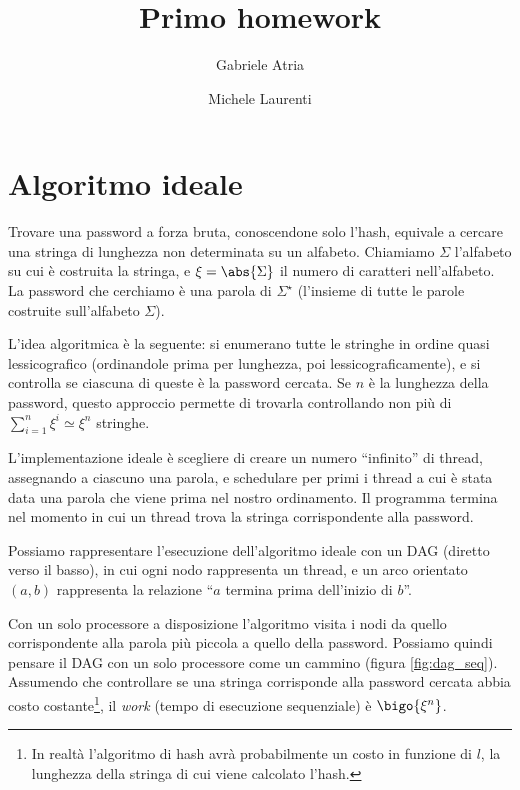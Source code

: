 \documentclass[]{myarticle}
\author{Gabriele Atria \and Michele Laurenti}
\begin{document}
\title{Primo homework}
\maketitle

\section{Algoritmo ideale}

Trovare una password a forza bruta, conoscendone solo l'hash, equivale a cercare una stringa di lunghezza non determinata su un alfabeto.
Chiamiamo $\Sigma$ l'alfabeto su cui \`e costruita la stringa, e $\xi = \abs{\Sigma}$ il numero di caratteri nell'alfabeto.
La password che cerchiamo \`e una parola di $\Sigma^{\star}$ (l'insieme di tutte le parole costruite sull'alfabeto $\Sigma$).

L'idea algoritmica \`e la seguente: si enumerano tutte le stringhe in ordine quasi lessicografico (ordinandole prima per lunghezza, poi lessicograficamente), e si controlla se ciascuna di queste \`e la password cercata.
Se $n$ \`e la lunghezza della password, questo approccio permette di trovarla controllando non pi\`u di $\sum_{i = 1}^{n} \xi^i \simeq \xi^n$ stringhe.

L'implementazione ideale \`e scegliere di creare un numero ``infinito'' di thread, assegnando a ciascuno una parola, e schedulare per primi i thread a cui \`e stata data una parola che viene prima nel nostro ordinamento.
Il programma termina nel momento in cui un thread trova la stringa corrispondente alla password.

Possiamo rappresentare l'esecuzione dell'algoritmo ideale con un DAG (diretto verso il basso), in cui ogni nodo rappresenta un thread, e un arco orientato $(a,b)$ rappresenta la relazione ``$a$ termina prima dell'inizio di $b$''.

Con un solo processore a disposizione l'algoritmo visita i nodi da quello corrispondente alla parola pi\`u piccola a quello della password.
Possiamo quindi pensare il DAG con un solo processore come un cammino (figura \ref{fig:dag_seq}).
Assumendo che controllare se una stringa corrisponde alla password cercata abbia costo costante\footnote{In realt\`a l'algoritmo di hash avr\`a probabilmente un costo in funzione di $l$, la lunghezza della stringa di cui viene calcolato l'hash.}, il \emph{work} (tempo di esecuzione sequenziale) \`e $\bigo{\xi^n}$.
\end{document}
